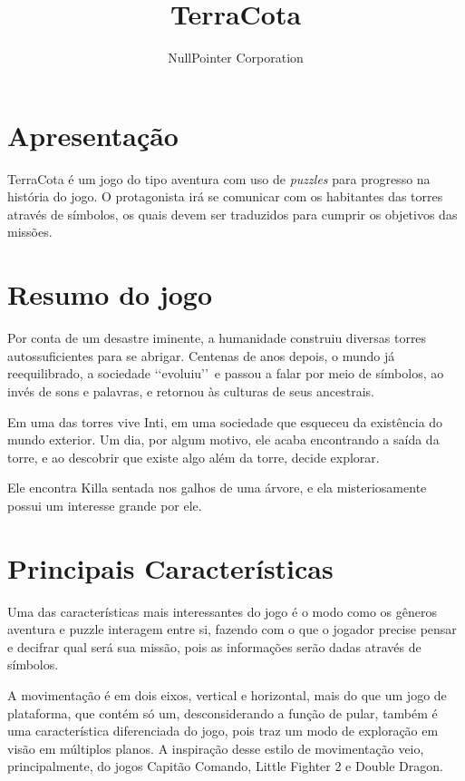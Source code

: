 \documentclass[12pt]{article}
\begin{document}
\title{\Huge TerraCota}
\author{\Large NullPointer Corporation}
\date{}
\maketitle

\newpage
\section{Apresentação}
TerraCota é um jogo do tipo aventura com uso de \textit{puzzles} para progresso
na história do jogo. O protagonista irá se comunicar com os habitantes das torres
através de símbolos, os quais devem ser traduzidos para cumprir os objetivos das
missões.

\section{Resumo do jogo}
Por conta de um desastre iminente, a humanidade construiu diversas torres
autossuficientes para se abrigar.
Centenas de anos depois, o mundo já reequilibrado, a sociedade \lq\lq evoluiu\rq\rq\
e passou a falar por meio de símbolos, ao invés de sons e palavras, e retornou
às culturas de seus ancestrais.

Em uma das torres vive Inti, em uma sociedade que esqueceu da existência do mundo
exterior. Um dia, por algum motivo, ele acaba encontrando a saída da torre, e ao
descobrir que existe algo além da torre, decide explorar.

Ele encontra Killa sentada nos galhos de uma árvore, e ela misteriosamente possui
um interesse grande por ele.

\section{Principais Características}
Uma das características mais interessantes do jogo é o modo como os gêneros
aventura e puzzle interagem entre si, fazendo com o que o jogador precise pensar
e decifrar qual será sua missão, pois as informações serão dadas através de símbolos.

A movimentação é em dois eixos, vertical e horizontal, mais do que um jogo de
plataforma, que contém só um, desconsiderando a função de pular, também é uma
característica diferenciada do jogo, pois traz um modo de exploração em visão
em múltiplos planos. A inspiração desse estilo de movimentação veio, principalmente,
do jogos Capitão Comando, Little Fighter 2 e Double Dragon.
\end{document}
